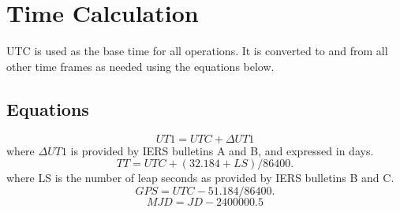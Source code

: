 \documentclass[12pt,letterpaper]{paper}
\begin{document}
\section{Time Calculation}
UTC is used as the base time for all operations. It is converted to and from all other time frames as needed using the equations below.
\subsection{Equations}
\begin{equation}
UT1 = UTC + {\Delta}UT1
\end{equation}
where ${\Delta}UT1$ is provided by IERS bulletins A and B, and expressed in days.
\begin{equation}
TT = UTC + (32.184 + LS)/86400.
\end{equation}
where LS is the number of leap seconds as provided by IERS bulletins B and C.
\begin{equation}
GPS = UTC - 51.184/86400.
\end{equation}
\begin{equation}
MJD = JD - 2400000.5
\end{equation}
\end{document}
